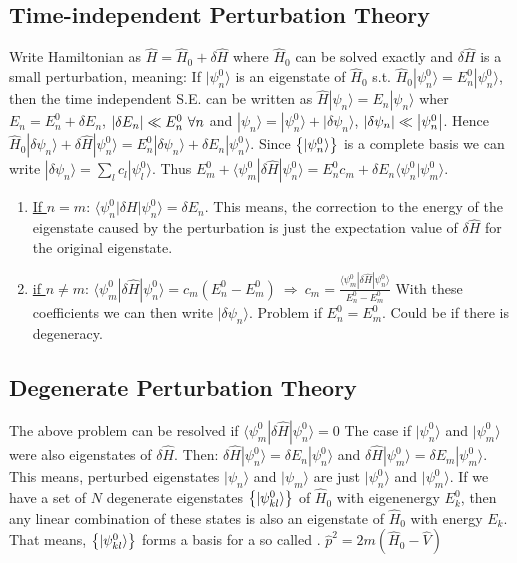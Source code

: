 \subsection{Time-independent Perturbation Theory}
Write Hamiltonian as $\hat{H} = \hat{H}_0 + \delta \hat{H}$ where $\hat{H}_0$
can be solved exactly and $\delta \hat{H}$ is a small perturbation, meaning:
If $| \psi_n^0 \rangle$ is an eigenstate of $\hat{H}_0$ s.t.
$\hat{H}_0 | \psi_n^0 \rangle = E_n^0 | \psi_n^0 \rangle$, then the time independent
S.E. can be written as $\hat{H} | \psi_n \rangle = E_n | \psi_n \rangle$
wher $E_n = E_n^0 + \delta E_n$, $\left\vert \delta E_n \right\vert \ll E_n^0 \ \forall n$
and $| \psi_n \rangle = | \psi_n^0 \rangle + | \delta \psi_n \rangle$,
$\left\vert \delta \psi_n \right\vert \ll \left\vert \psi_n^0 \right\vert$. Hence
$\hat{H}_0 | \delta \psi_n \rangle + \delta \hat{H} | \psi_n^0 \rangle =
E_n^0 | \delta \psi_n \rangle + \delta E_n | \psi_n^0 \rangle$. Since
$\left\{ | \psi_n^0 \rangle \right\}$ is a complete basis we can write
$| \delta \psi_n \rangle = \sum_l c_l | \psi_l^0 \rangle$. Thus
$E_m^0 + \langle \psi_m^0 | \delta \hat{H} | \psi_n^0 \rangle = E_n^0 c_m +
\delta E_n \langle \psi_n^0 | \psi_m^0 \rangle$.
\begin{enumerate}[]
    \item \underline{If $n=m$}: $\langle \psi_n^0 | \delta H | \psi_n^0 \rangle = \delta E_n$.
        This means, the correction to the energy of the eigenstate caused by the perturbation
        is just the expectation value of $\delta \hat{H}$ for the original eigenstate.
    \item \underline{if $n \neq m$}: $\langle \psi_m^0 | \delta \hat{H} | \psi_n^0 \rangle
        = c_m (E_n^0 - E_m^0) \ \Rightarrow \ c_m = \frac{\langle \psi_m^0 | \delta \hat{H} | \psi_n^0 \rangle}{E_n^0 - E_m^0}$
        With these coefficients we can then write $| \delta \psi_n  \rangle$.
        Problem if $E_n^0 = E_m^0$. Could be if there is degeneracy.
\end{enumerate}

\subsection{Degenerate Perturbation Theory}
The above problem can be resolved if $\langle \psi_m^0 | \delta \hat{H} | \psi_n^0 \rangle = 0$
The case if $| \psi_n^0 \rangle$ and $| \psi_m^0 \rangle$ were also eigenstates
of $\delta \hat{H}$. Then: $\delta \hat{H} | \psi_n^0 \rangle = \delta E_n | \psi_n^0 \rangle$
and $\delta \hat{H} | \psi_m^0 \rangle = \delta E_m | \psi_m^0 \rangle$. This means,
perturbed eigenstates $| \psi_n \rangle$ and $| \psi_m \rangle$ are just
$| \psi_n^0 \rangle$ and $| \psi_m^0 \rangle$. If we have a set of $N$ degenerate
eigenstates $\left\{ | \psi_{kl}^0 \rangle \right\}$ of $\hat{H}_0$ with
eigenenergy $E_k^0$, then any linear combination of these states is also an
eigenstate of $\hat{H}_0$ with energy $E_k$. That means, $\left\{ | \psi_{kl}^0 \rangle \right\}$
forms a basis for a so called .
$\hat{p}^2 = 2 m (\hat{H}_0 - \hat{V})$

